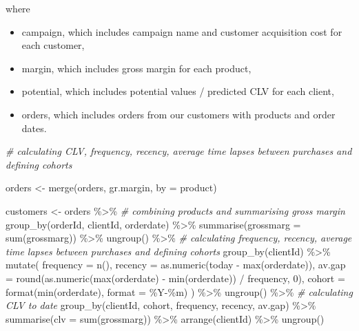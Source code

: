 \documentclass[
]{book}
\newenvironment{Shaded}{\begin{snugshade}}{\end{snugshade}}
\newcommand{\AttributeTok}[1]{\textcolor[rgb]{0.77,0.63,0.00}{#1}}
\newcommand{\CommentTok}[1]{\textcolor[rgb]{0.56,0.35,0.01}{\textit{#1}}}
\newcommand{\DecValTok}[1]{\textcolor[rgb]{0.00,0.00,0.81}{#1}}
\newcommand{\FunctionTok}[1]{\textcolor[rgb]{0.00,0.00,0.00}{#1}}
\newcommand{\NormalTok}[1]{#1}
\newcommand{\OtherTok}[1]{\textcolor[rgb]{0.56,0.35,0.01}{#1}}
\newcommand{\SpecialCharTok}[1]{\textcolor[rgb]{0.00,0.00,0.00}{#1}}
\newcommand{\StringTok}[1]{\textcolor[rgb]{0.31,0.60,0.02}{#1}}
\providecommand{\tightlist}{%
  \setlength{\itemsep}{0pt}\setlength{\parskip}{0pt}}
\begin{document}
where

\begin{itemize}
\tightlist
\item
  campaign, which includes campaign name and customer acquisition cost for each customer,
\item
  margin, which includes gross margin for each product,
\item
  potential, which includes potential values / predicted CLV for each client,
\item
  orders, which includes orders from our customers with products and order dates.
\end{itemize}

\begin{Shaded}
\begin{Highlighting}[]
\CommentTok{\# calculating CLV, frequency, recency, average time lapses between purchases and defining cohorts}

\NormalTok{orders }\OtherTok{\textless{}{-}} \FunctionTok{merge}\NormalTok{(orders, gr.margin, }\AttributeTok{by =} \StringTok{\textquotesingle{}product\textquotesingle{}}\NormalTok{)}

\NormalTok{customers }\OtherTok{\textless{}{-}}\NormalTok{ orders }\SpecialCharTok{\%\textgreater{}\%}
    \CommentTok{\# combining products and summarising gross margin}
    \FunctionTok{group\_by}\NormalTok{(orderId, clientId, orderdate) }\SpecialCharTok{\%\textgreater{}\%}
    \FunctionTok{summarise}\NormalTok{(}\AttributeTok{grossmarg =} \FunctionTok{sum}\NormalTok{(grossmarg)) }\SpecialCharTok{\%\textgreater{}\%}
    \FunctionTok{ungroup}\NormalTok{() }\SpecialCharTok{\%\textgreater{}\%}
    \CommentTok{\# calculating frequency, recency, average time lapses between purchases and defining cohorts}
    \FunctionTok{group\_by}\NormalTok{(clientId) }\SpecialCharTok{\%\textgreater{}\%}
    \FunctionTok{mutate}\NormalTok{(}
        \AttributeTok{frequency =} \FunctionTok{n}\NormalTok{(),}
        \AttributeTok{recency =} \FunctionTok{as.numeric}\NormalTok{(today }\SpecialCharTok{{-}} \FunctionTok{max}\NormalTok{(orderdate)),}
        \AttributeTok{av.gap =} \FunctionTok{round}\NormalTok{(}\FunctionTok{as.numeric}\NormalTok{(}\FunctionTok{max}\NormalTok{(orderdate) }\SpecialCharTok{{-}} \FunctionTok{min}\NormalTok{(orderdate)) }\SpecialCharTok{/}\NormalTok{ frequency, }\DecValTok{0}\NormalTok{),}
        \AttributeTok{cohort =} \FunctionTok{format}\NormalTok{(}\FunctionTok{min}\NormalTok{(orderdate), }\AttributeTok{format =} \StringTok{\textquotesingle{}\%Y{-}\%m\textquotesingle{}}\NormalTok{)}
\NormalTok{    ) }\SpecialCharTok{\%\textgreater{}\%}
    \FunctionTok{ungroup}\NormalTok{() }\SpecialCharTok{\%\textgreater{}\%}
    \CommentTok{\# calculating CLV to date}
    \FunctionTok{group\_by}\NormalTok{(clientId, cohort, frequency, recency, av.gap) }\SpecialCharTok{\%\textgreater{}\%}
    \FunctionTok{summarise}\NormalTok{(}\AttributeTok{clv =} \FunctionTok{sum}\NormalTok{(grossmarg)) }\SpecialCharTok{\%\textgreater{}\%}
    \FunctionTok{arrange}\NormalTok{(clientId) }\SpecialCharTok{\%\textgreater{}\%}
    \FunctionTok{ungroup}\NormalTok{()}
\end{Highlighting}
\end{Shaded}
\end{document}
